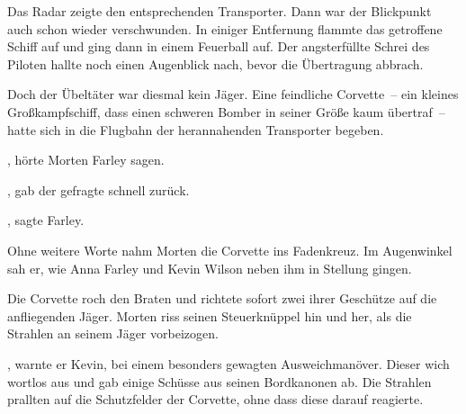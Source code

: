 Das Radar zeigte den entsprechenden Transporter. Dann war der Blickpunkt auch schon wieder verschwunden. In einiger Entfernung flammte das getroffene Schiff auf und ging dann in einem Feuerball auf. Der angsterfüllte Schrei des Piloten hallte noch einen Augenblick nach, bevor die Übertragung abbrach.

\par

Doch der Übeltäter war diesmal kein Jäger. Eine feindliche Corvette~-- ein kleines Großkampfschiff, dass einen schweren Bomber in seiner Größe kaum übertraf~-- hatte sich in die Flugbahn der herannahenden Transporter begeben.

\par

, hörte Morten Farley sagen. 

\par

, gab der gefragte schnell zurück.

\par


\par


\par

, sagte Farley. 

\par

Ohne weitere Worte nahm Morten die Corvette ins Fadenkreuz. Im Augenwinkel sah er, wie Anna Farley und Kevin Wilson neben ihm in Stellung gingen.

\par

Die Corvette roch den Braten und richtete sofort zwei ihrer Geschütze auf die anfliegenden Jäger. Morten riss seinen Steuerknüppel hin und her, als die Strahlen an seinem Jäger vorbeizogen.

\par

, warnte er Kevin, bei einem besonders gewagten Ausweichmanöver. Dieser wich wortlos aus und gab einige Schüsse aus seinen Bordkanonen ab. Die Strahlen prallten auf die Schutzfelder der Corvette, ohne dass diese darauf reagierte.

